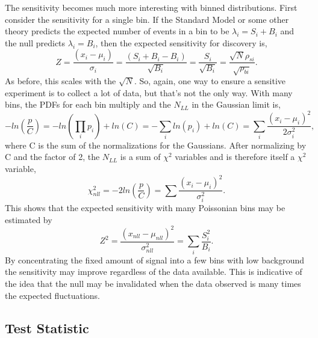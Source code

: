 The sensitivity becomes much more interesting with binned distributions. First consider the sensitivity for a single bin. If the Standard Model or some other theory predicts the expected number of events in a bin to be $\lambda_i=S_i+B_i$ and the null predicts $\lambda_i=B_i$, then the expected sensitivity for discovery is,
\begin{equation}
Z = \frac{(x_i-\mu_i)}{\sigma_i} = \frac{(S_i+B_i-B_i)}{\sqrt{B_i}} = \frac{S_i}{\sqrt{B_i}} = \frac{\sqrt{N}\rho_{si}}{\sqrt{\rho_{bi}}}.
\end{equation}
As before, this scales with the $\sqrt{N}$. So, again, one way to ensure a sensitive experiment is to collect a lot of data, but that's not the only way. With many bins, the PDFs for each bin multiply and the $N_{LL}$ in the Gaussian limit is,
\begin{equation}
\label{eq:norm}
-ln\left(\frac{p}{C}\right) = -ln\left(\prod_i p_i\right) + ln\left( C \right) 
                            = -\sum_i ln\left(p_i\right) + ln\left( C \right) 
                            = \sum_i \frac{(x_i-\mu_i)^2}{2\sigma_i^2},
\end{equation}
where C is the sum of the normalizations for the Gaussians. After normalizing by C and the factor of 2, the $N_{LL}$ is a sum of $\chi^2$ variables and is therefore itself a $\chi^2$ variable, 
\begin{equation}
\chi^2_{nll} = -2ln\left(\frac{p}{C}\right) = \sum \frac{(x_i-\mu_i)^2}{\sigma_i^2}.
\end{equation}
This shows that the expected sensitivity with many Poissonian bins may be estimated by
\begin{equation}
Z^2 = \frac{(x_{nll}-\mu_{nll})^2}{\sigma_{nll}^2} = \sum_i \frac{S_i^2}{B_i}.  
\end{equation}
By concentrating the fixed amount of signal into a few bins with low background the sensitivity may improve regardless of the data available. This is indicative of the idea that the null may be invalidated when the data observed is many times the expected fluctuations.

\subsection{Test Statistic}

